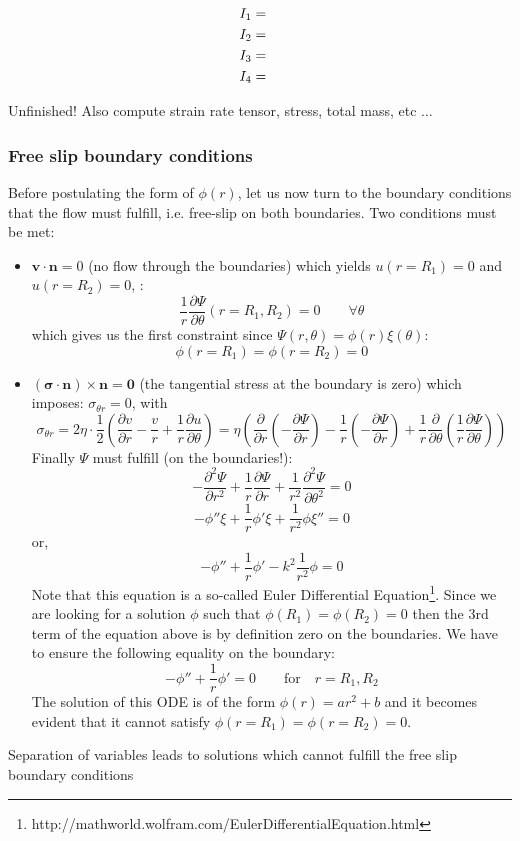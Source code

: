 \begin{eqnarray}
I_1 &=&     \nonumber\\
I_2 &=&     \nonumber\\
I_3 &=&     \nonumber\\
I_4 &=&     \nonumber
\end{eqnarray}

Unfinished! Also compute strain rate tensor, stress, total mass, etc ...





\subsubsection*{Free slip boundary conditions}


Before postulating the form of $\phi(r)$, let us now turn to the boundary conditions that the flow must fulfill, i.e. free-slip on both boundaries.
Two conditions must be met:

\begin{itemize}
\item ${\bm v} \cdot {\bm n}=0$ (no flow through the boundaries) which yields $u(r=R_1)=0$ and $u(r=R_2)=0$, :
\[
\frac{1}{r}\frac{\partial \Psi}{\partial \theta} (r=R_1,R_2)=0   \quad\quad \forall \theta
\]
which gives us the first constraint since $\Psi(r,\theta)=\phi(r)\xi(\theta)$:
\[
\phi(r=R_1)=\phi(r=R_2)=0  
\]
\item $({\bm \sigma} \cdot {\bm n}) \times {\bm n} = {\bm 0} $  (the tangential stress at the boundary is zero)
which imposes: $\sigma_{\theta r}=0$, with
\[
\sigma_{\theta r}=
2 \eta \cdot \frac{1}{2} \left( \frac{\partial v}{\partial r} - \frac{v}{r} + \frac{1}{r} \frac{\partial u}{\partial \theta}    \right)
= \eta \left( \frac{\partial }{\partial r} (- \frac{\partial \Psi}{\partial r}) -
\frac{1}{r} (- \frac{\partial \Psi}{\partial r}) + \frac{1}{r} \frac{\partial }{\partial \theta} (\frac{1}{r}\frac{\partial \Psi}{\partial \theta})    \right)
\]
Finally $\Psi$ must fulfill (on the boundaries!):
\[
-\frac{\partial^2 \Psi}{\partial r^2} + \frac{1}{r}  \frac{\partial \Psi}{\partial r} + \frac{1}{r^2} \frac{\partial^2 \Psi}{\partial \theta^2}=0
\]
\[
- \phi'' \xi + \frac{1}{r} \phi' \xi +  \frac{1}{r^2}  \phi \xi'' = 0
\]
or, 
\[
- \phi''  + \frac{1}{r} \phi'  -k^2  \frac{1}{r^2}  \phi  = 0
\]
Note that this equation is a so-called Euler Differential 
Equation\footnote{http://mathworld.wolfram.com/EulerDifferentialEquation.html}.
Since we are looking for a solution $\phi$ such that $\phi(R_1)=\phi(R_2)=0 $ then 
the 3rd term of the equation above is by definition zero on the boundaries.
We have to ensure the following equality on the boundary:
\[
- \phi''  + \frac{1}{r} \phi'   = 0\quad\quad \text{for} \quad r=R_1,R_2
\]
The solution of this ODE is of the form $\phi(r)=ar^2+b$ and it becomes 
evident that it cannot satisfy $\phi(r=R_1)=\phi(r=R_2)=0$.




\end{itemize}

{\color{red} Separation of variables leads to solutions which cannot fulfill the free slip 
boundary conditions}








